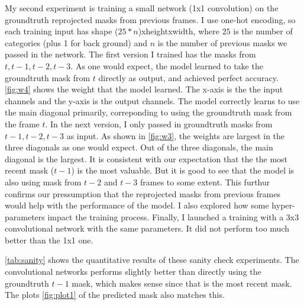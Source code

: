 My second experiment is training a small network (1x1 convolution) on the groundtruth reprojected masks from previous frames. I use one-hot encoding, so each training input has shape ($25*n$)xheightxwidth, where $25$ is the number of categories (plus 1 for back ground) and $n$ is the number of previous masks we passed in the network. The first version I trained has the masks from $t,t-1,t-2,t-3$. As one would expect, the model learned to take the groundtruth mask from $t$ directly as output, and achieved perfect accuracy. \ref{fig:w4} shows the weight that the model learned. The x-axis is the the input channels and the y-axis is the output channels. The model correctly learns to use the main diagonal primarily, correponding to using the groundtruth mask from the frame $t$. In the next version, I only passed in groundtruth masks from $t-1,t-2,t-3$ as input. As shown in \ref{fig:w3}, the weights are largest in the three diagonals as one would expect. Out of the three diagonals, the main diagonal is the largest. It is consistent with our expectation that the the most recent mask ($t-1$) is the most valuable. But it is good to see that the model is also using mask from $t-2$ and $t-3$ frames to some extent. This furthur confirms our pressumption that the reprojected masks from previous frames would help with the performance of the model. I also explored how some hyper-parameters impact the training process. Finally, I launched a training with a 3x3 convolutional network with the same parameters. It did not perform too much better than the 1x1 one. 

\ref{tab:sanity} shows the quantitative results of these sanity check experiments. The convolutional networks performs slightly better than directly using the groundtruth $t-1$ mask, which makes sense since that is the most recent mask. The plots \ref{fig:plot1} of the predicted mask also matches this.

